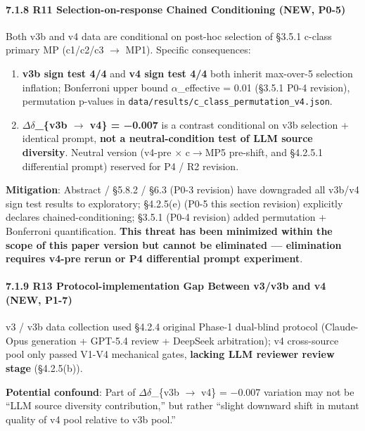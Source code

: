 \documentclass[review,12pt,authoryear]{elsarticle}
\begin{document}
\paragraph{7.1.8 R11 Selection-on-response Chained Conditioning (NEW,
P0-5)}\label{r11-selection-on-response-chained-conditioning-new-p0-5}

Both v3b and v4 data are conditional on post-hoc selection of §3.5.1
c-class primary MP (c1/c2/c3 $\to$ MP1). Specific consequences:

\begin{enumerate}
\def\labelenumi{(\alph{enumi})}
\item
  \textbf{v3b sign test 4/4} and \textbf{v4 sign test 4/4} both inherit
  max-over-5 selection inflation; Bonferroni upper bound $\alpha$\_effective =
  0.01 (§3.5.1 P0-4 revision), permutation p-values in
  \texttt{data/results/c\_class\_permutation\_v4.json}.
\item
  \textbf{$\Delta$$\delta$\_\{v3b $\to$ v4\} = −0.007} is a contrast conditional on v3b
  selection + identical prompt, \textbf{not a neutral-condition test of
  LLM source diversity}. Neutral version (v4-pre $\times$ c$\to$MP5 pre-shift, and
  §4.2.5.1 differential prompt) reserved for P4 / R2 revision.
\end{enumerate}

\textbf{Mitigation}: Abstract / §5.8.2 / §6.3 (P0-3 revision) have
downgraded all v3b/v4 sign test results to exploratory; §4.2.5(e) (P0-5
this section revision) explicitly declares chained-conditioning; §3.5.1
(P0-4 revision) added permutation + Bonferroni quantification.
\textbf{This threat has been minimized within the scope of this paper
version but cannot be eliminated --- elimination requires v4-pre rerun
or P4 differential prompt experiment}.

\paragraph{7.1.9 R13 Protocol-implementation Gap Between v3/v3b and v4
(NEW,
P1-7)}\label{r13-protocol-implementation-gap-between-v3v3b-and-v4-new-p1-7}

v3 / v3b data collection used §4.2.4 original Phase-1 dual-blind
protocol (Claude-Opus generation + GPT-5.4 review + DeepSeek
arbitration); v4 cross-source pool only passed V1-V4 mechanical gates,
\textbf{lacking LLM reviewer review stage} (§4.2.5(b)).

\textbf{Potential confound}: Part of $\Delta$$\delta$\_\{v3b $\to$ v4\} = −0.007 variation
may not be ``LLM source diversity contribution,'' but rather ``slight
downward shift in mutant quality of v4 pool relative to v3b pool.''
\end{document}
